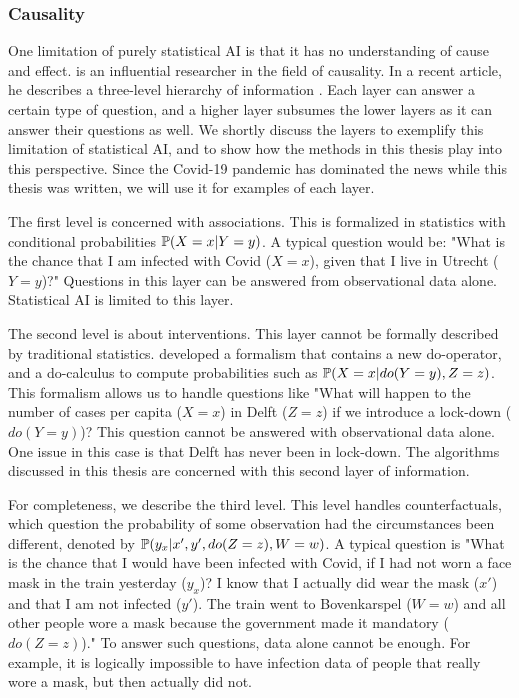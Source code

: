 \subsubsection{Causality}

One limitation of purely statistical AI is that it has no understanding of cause and effect. \citet{pearl2009causality} is an influential researcher in the field of causality. In a recent article, he describes a three-level hierarchy of information \citep{pearl2019seven}. Each layer can answer a certain type of question, and a higher layer subsumes the lower layers as it can answer their questions as well. We shortly discuss the layers to exemplify this limitation of statistical AI, and to show how the methods in this thesis play into this perspective. Since the Covid-19 pandemic has dominated the news while this thesis was written, we will use it for examples of each layer.

The first level is concerned with associations. This is formalized in statistics with conditional probabilities $\mathbb{P}(X=x|Y=y)$. A typical question would be: "What is the chance that I am infected with Covid ($X=x$), given that I live in Utrecht ($Y=y$)?" Questions in this layer can be answered from observational data alone. Statistical AI is limited to this layer.

The second level is about interventions. This layer cannot be formally described by traditional statistics. \citet{pearl2009causality} developed a formalism that contains a new do-operator, and a do-calculus to compute probabilities such as $\mathbb{P}(X=x|do(Y=y),Z=z)$. This formalism allows us to handle questions like "What will happen to the number of cases per capita ($X=x$) in Delft ($Z=z$) if we introduce a lock-down ($do(Y=y)$)? This question cannot be answered with observational data alone. One issue in this case is that Delft has never been in lock-down. The algorithms discussed in this thesis are concerned with this second layer of information.

For completeness, we describe the third level. This level handles counterfactuals, which question the probability of some observation had the circumstances been different, denoted by $\mathbb{P}(y_x|x',y',do(Z=z),W=w)$. A typical question is "What is the chance that I would have been infected with Covid, if I had not worn a face mask in the train yesterday ($y_x$)? I know that I actually did wear the mask ($x'$) and that I am not infected ($y'$). The train went to Bovenkarspel ($W=w$) and all other people wore a mask because the government made it mandatory ($do(Z=z)$)." To answer such questions, data alone cannot be enough. For example, it is logically impossible to have infection data of people that really wore a mask, but then actually did not. 


